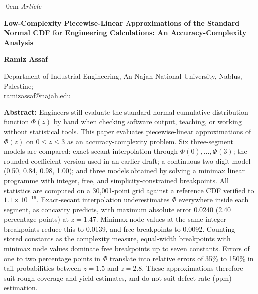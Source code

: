 \documentclass[10pt,a4paper]{article}
\newlength{\extralength}\setlength{\extralength}{3.0cm}
\begin{document}
\thispagestyle{first}

\begin{adjustwidth}{-\extralength}{0cm}
{\small\textit{Article}}\par\vspace{4pt}
{\Large\bfseries Low-Complexity Piecewise-Linear Approximations of the Standard Normal CDF for Engineering Calculations: An Accuracy-Complexity Analysis\par}
\vspace{10pt}
{\bfseries Ramiz Assaf}\par\vspace{4pt}
{\small Department of Industrial Engineering, An-Najah National University, Nablus, Palestine;\\
ramizassaf@najah.edu}
\end{adjustwidth}


\vspace{10pt}
\noindent\textbf{Abstract:} Engineers still evaluate the standard normal cumulative distribution function $\Phi(z)$ by hand when checking software output, teaching, or working without statistical tools. This paper evaluates piecewise-linear approximations of $\Phi(z)$ on $0 \le z \le 3$ as an accuracy-complexity problem. Six three-segment models are compared: exact-secant interpolation through $\Phi(0),\ldots,\Phi(3)$; the rounded-coefficient version used in an earlier draft; a continuous two-digit model (0.50, 0.84, 0.98, 1.00); and three models obtained by solving a minimax linear programme with integer, free, and simplicity-constrained breakpoints. All statistics are computed on a 30{,}001-point grid against a reference CDF verified to $1.1\times10^{-16}$. Exact-secant interpolation underestimates $\Phi$ everywhere inside each segment, as concavity predicts, with maximum absolute error 0.0240 (2.40 percentage points) at $z = 1.47$. Minimax node values at the same integer breakpoints reduce this to 0.0139, and free breakpoints to 0.0092. Counting stored constants as the complexity measure, equal-width breakpoints with minimax node values dominate free breakpoints up to seven constants. Errors of one to two percentage points in $\Phi$ translate into relative errors of 35\% to 150\% in tail probabilities between $z = 1.5$ and $z = 2.8$. These approximations therefore suit rough coverage and yield estimates, and do not suit defect-rate (ppm) estimation.
\end{document}
